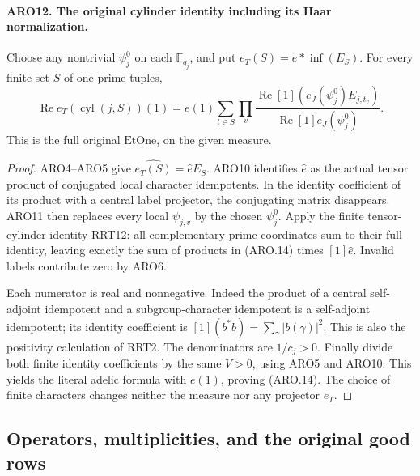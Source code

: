 \documentclass[11pt,a4paper]{article}
\numberwithin{equation}{section}
\theoremstyle{remark}\newtheorem{remark}[theorem]{Remark}
\begin{document}
\paragraph{ARO12. The original cylinder identity including its Haar normalization.}
\label{claim:ARO12}
Choose any nontrivial \(\psi_j^0\) on each \(\mathbb F_{q_j}\),
and put \(e_T(S)=e*\operatorname{inf}(E_S)\).  For every finite
set \(S\) of one-prime tuples,
\[
 \operatorname{Re}e_T(\operatorname{cyl}(j,S))(1)
   =e(1)\sum_{t\in S}\prod_v
      \frac{\operatorname{Re}[1](e_J(\psi_j^0)E_{j,t_v})}
           {\operatorname{Re}[1]e_J(\psi_j^0)}.
 \tag{ARO.14}
\]
This is the full original \(\mathrm{EtOne}\), on the given measure.
\begin{proof}
ARO4--ARO5 give \(\widehat{e_T(S)}=\widehat e E_S\).
ARO10 identifies \(\widehat e\) as the actual tensor product of
conjugated local character idempotents.  In the identity coefficient
of its product with a central label projector, the conjugating
matrix disappears.  ARO11 then replaces every local \(\psi_{j,v}\)
by the chosen \(\psi_j^0\).  Apply the finite tensor-cylinder
identity RRT12: all complementary-prime coordinates sum to their
full identity, leaving exactly the sum of products in (ARO.14)
times \([1]\widehat e\).  Invalid labels contribute zero by ARO6.

Each numerator is real and nonnegative.  Indeed the product of a
central self-adjoint idempotent and a subgroup-character idempotent
is a self-adjoint idempotent; its identity coefficient is
\([1](b^*b)=\sum_\gamma|b(\gamma)|^2\).  This is also the
positivity calculation of RRT2.  The denominators are \(1/c_j>0\).
Finally divide both finite identity coefficients by the same
\(V>0\), using ARO5 and ARO10.  This yields the literal adelic
formula with \(e(1)\), proving (ARO.14).  The choice of finite
characters changes neither the measure nor any projector \(e_T\).
\end{proof}

\subsection{Operators, multiplicities, and the original good rows}

\end{document}
